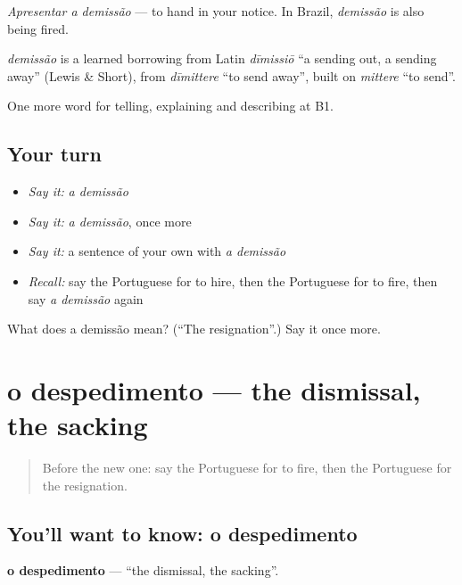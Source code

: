 \emph{Apresentar a demissão} — to hand in your notice. In Brazil, \emph{demissão} is also being fired.

\begin{cousinweb}
\emph{demissão} is a learned borrowing from Latin \emph{dīmissiō} \textquotedblleft{}a sending out, a sending away\textquotedblright{} (Lewis \& Short), from \emph{dīmittere} \textquotedblleft{}to send away\textquotedblright{}, built on \emph{mittere} \textquotedblleft{}to send\textquotedblright{}.
\end{cousinweb}

\begin{grammarlens}[title={What you've built}]
One more word for telling, explaining and describing at B1.
\end{grammarlens}

\subsection*{Your turn}
\begin{itemize}
\raggedright
  \item \emph{Say it:} \emph{a demissão}
  \item \emph{Say it:} \emph{a demissão}, once more
  \item \emph{Say it:} a sentence of your own with \emph{a demissão}
  \item \emph{Recall:} say the Portuguese for to hire, then the Portuguese for to fire, then say \emph{a demissão} again
\end{itemize}

\begin{tcolorbox}[breakable,colback=teal!4,colframe=teal!35!black,title={Before you move on}]
What does a demissão mean? (\textquotedblleft{}The resignation\textquotedblright{}.) Say it once more.
\end{tcolorbox}
\section[o despedimento]{o despedimento — the dismissal, the sacking}

\label{lesson:PT-C356-despedimento}



\begin{quote}
Before the new one: say the Portuguese for to fire, then the Portuguese for the resignation.
\end{quote}

\subsection*{You'll want to know: o despedimento}
\textbf{o despedimento} — \textquotedblleft{}the dismissal, the sacking\textquotedblright{}.

